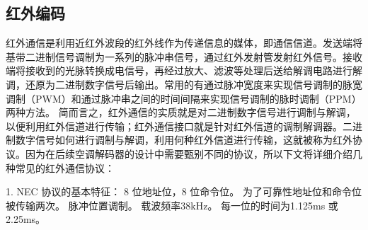 



\subsection{红外编码}
红外通信是利用近红外波段的红外线作为传递信息的媒体，即通信信道。发送端将基带二进制信号调制为一系列的脉冲串信号，通过红外发射管发射红外信号。接收端将接收到的光脉转换成电信号，再经过放大、滤波等处理后送给解调电路进行解调，还原为二进制数字信号后输出。常用的有通过脉冲宽度来实现信号调制的脉宽调制（PWM）和通过脉冲串之间的时间间隔来实现信号调制的脉时调制（PPM）两种方法。 简而言之，红外通信的实质就是对二进制数字信号进行调制与解调，以便利用红外信道进行传输；红外通信接口就是针对红外信道的调制解调器。二进制数字信号如何进行调制与解调，利用何种红外信道进行传输，这就被称为红外协议。因为在后续空调解码器的设计中需要甄别不同的协议，所以下文将详细介绍几种常见的红外通信协议：

1. NEC 协议的基本特征：
	8 位地址位，8 位命令位。
	为了可靠性地址位和命令位被传输两次。
	脉冲位置调制。
	载波频率38kHz。
	每一位的时间为1.125ms 或 2.25ms。

